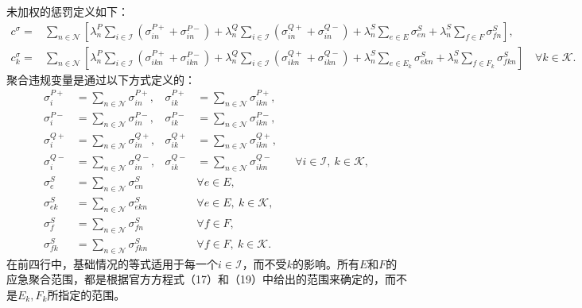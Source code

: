 \documentclass{article}
\begin{document}
未加权的惩罚定义如下：
\begin{align*}
c^\sigma={}&\sum_{n\in\mathcal N}\left[
\lambda_n^P\sum_{i\in\mathcal I}(\sigma_{in}^{P+}+\sigma_{in}^{P-})
+\lambda_n^Q\sum_{i\in\mathcal I}(\sigma_{in}^{Q+}+\sigma_{in}^{Q-})
+\lambda_n^S\sum_{e\in E}\sigma_{en}^S
+\lambda_n^S\sum_{f\in F}\sigma_{fn}^S\right],\\
c_k^\sigma={}&\sum_{n\in\mathcal N}\left[
\lambda_n^P\sum_{i\in\mathcal I}(\sigma_{ikn}^{P+}+\sigma_{ikn}^{P-})
+\lambda_n^Q\sum_{i\in\mathcal I}(\sigma_{ikn}^{Q+}+\sigma_{ikn}^{Q-})
+\lambda_n^S\sum_{e\in E_k}\sigma_{ekn}^S
+\lambda_n^S\sum_{f\in F_k}\sigma_{fkn}^S\right]
\quad\forall k\in\mathcal K.
\end{align*}
聚合违规变量是通过以下方式定义的：
\begin{align*}
\sigma_i^{P+}&=\sum_{n\in\mathcal N}\sigma_{in}^{P+},&
\sigma_{ik}^{P+}&=\sum_{n\in\mathcal N}\sigma_{ikn}^{P+},\\
\sigma_i^{P-}&=\sum_{n\in\mathcal N}\sigma_{in}^{P-},&
\sigma_{ik}^{P-}&=\sum_{n\in\mathcal N}\sigma_{ikn}^{P-},\\
\sigma_i^{Q+}&=\sum_{n\in\mathcal N}\sigma_{in}^{Q+},&
\sigma_{ik}^{Q+}&=\sum_{n\in\mathcal N}\sigma_{ikn}^{Q+},\\
\sigma_i^{Q-}&=\sum_{n\in\mathcal N}\sigma_{in}^{Q-},&
\sigma_{ik}^{Q-}&=\sum_{n\in\mathcal N}\sigma_{ikn}^{Q-}
&&\forall i\in\mathcal I,\ k\in\mathcal K,\\
\sigma_e^S&=\sum_{n\in\mathcal N}\sigma_{en}^S
&&\forall e\in E,\\
\sigma_{ek}^S&=\sum_{n\in\mathcal N}\sigma_{ekn}^S
&&\forall e\in E,\ k\in\mathcal K,\\
\sigma_f^S&=\sum_{n\in\mathcal N}\sigma_{fn}^S
&&\forall f\in F,\\
\sigma_{fk}^S&=\sum_{n\in\mathcal N}\sigma_{fkn}^S
&&\forall f\in F,\ k\in\mathcal K.
\end{align*}
在前四行中，基础情况的等式适用于每一个$i\in\mathcal I$，而不受$k$的影响。所有$E$和$F$的应急聚合范围，都是根据官方方程式（17）和（19）中给出的范围来确定的，而不是$E_k,F_k$所指定的范围。
\end{document}
